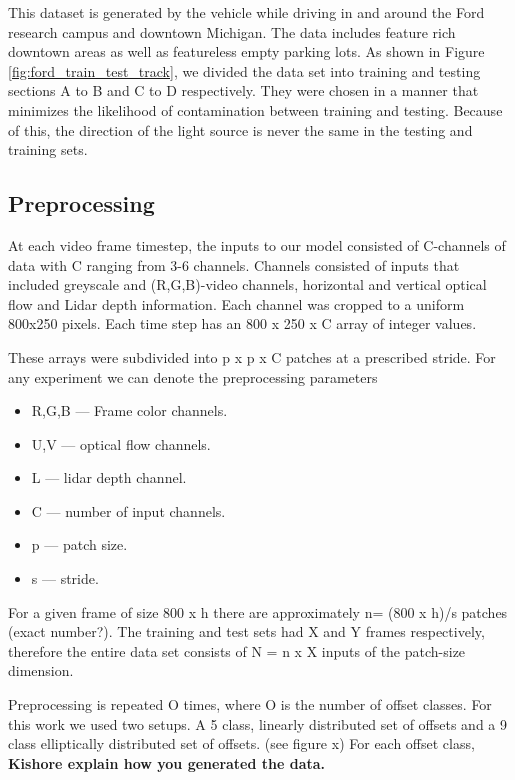\documentclass{article}
\begin{document}
This dataset is generated by the vehicle while driving in and around the Ford research campus and downtown Michigan. The data includes feature rich downtown areas as well as featureless empty parking lots. As shown in Figure \ref{fig:ford_train_test_track}, we divided the data set into training and testing sections A to B and C to D respectively. They were chosen in a manner that minimizes the likelihood of contamination between training and testing. Because of this, the direction of the light source is never the same in the testing and training sets. %


\subsection{Preprocessing} %
\label{sub:preprocessing}
At each video frame timestep, the inputs to our model consisted of C-channels of data with C ranging from 3-6 channels. Channels consisted of inputs that included greyscale and (R,G,B)-video channels, horizontal and vertical optical flow and Lidar depth information. Each channel was cropped to a uniform 800x250 pixels. Each time step has an 800 x 250 x C array of integer values.

These arrays were subdivided into p x p x C patches at a prescribed stride. For any experiment we can denote the preprocessing parameters 
\begin{itemize}
\item R,G,B --- Frame color channels.
\item U,V --- optical flow channels.
\item L --- lidar depth channel.
\item C --- number of input channels.
\item p --- patch size.
\item s --- stride.
\end{itemize}  

For a given frame of size 800 x h there are approximately n= (800 x h)/s patches (exact number?). The training and test sets had X and Y frames respectively, therefore the entire data set consists of  N = n x X inputs of the patch-size dimension. 

Preprocessing is repeated O times, where O is the number of offset classes. For this work we used two setups. A 5 class, linearly distributed set of offsets and a 9 class elliptically distributed set of offsets. (see figure x) For each offset class, \textbf{Kishore explain how you generated the data.} 
\end{document}
